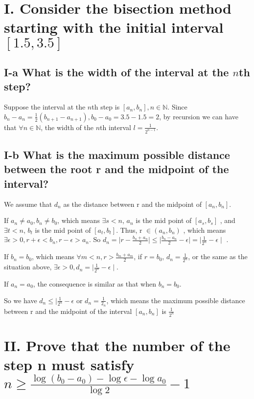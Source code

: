 \documentclass[twoside,a4paper]{article}
\begin{document}
\pagestyle{fancy}
\fancyhead{}


\section*{I. \small{Consider the bisection method starting with the initial interval $[1.5,3.5]$}}

\subsection*{I-a \small{What is the width of the interval at the $n$th step?}} 

Suppose the interval at the $n$th step is $[a_{n},b_{n}],n\in\mathbb{N}$. 
Since $b_{n}-a_{n}=\frac{1}{2}(b_{n+1}-a_{n+1}), b_{0}-a_{0}=3.5-1.5=2$, 
by recursion we can have that $\forall n\in\mathbb{N}$, the width of the $n$th interval $l=\frac{1}{2^{n-1}}$.
 
\subsection*{I-b \small{What is the maximum possible distance between the root r and the midpoint of the interval?}}

We assume that $d_{n}$ as the distance between r and the midpoint of $[a_{n}, b_{n}]$.  

If  $a_{n}\neq a_{0}, b_{n}\neq b_{0}$, which means $\exists s<n$, $a_{n}$ is the mid point of $[a_{s},b_{s}]$
, and $\exists t<n$, $b_{t}$ is the mid point of $[a_{t}, b_{t}]$. Thus, r $\in \left( a_{n},b_{n} \right) $ 
, which means $\exists \epsilon>0 , r+\epsilon<b_{n},r-\epsilon>a_{n}$. So $d_{n}= \mid r-\frac{b_{n}+a_{n}}{2} \mid \le
 \mid \frac{b_{n}-a_{n}}{2}-\epsilon \mid = \mid \frac{1}{2^{n}}-\epsilon \mid $
 . 
 
 If $b_{n}=b_{0}$, which means $\forall m<n, r>\frac{b_{m}+a_{m}}{2}$, if $r=b_{0}$, $d_{n} = \frac{1}{2^{n}}$, or 
 the same as the situation above, $\exists \epsilon>0, d_{n}=  \mid \frac{1}{2^{n}}-\epsilon \mid $.
 
 If $a_{n}=a_{0}$, the consequence is similar as that when $b_{n}=b_{0}$.
 
 So we have $d_{n} \le  \mid \frac{1}{2^{n}}-\epsilon$ or $d_{n}=\frac{1}{2_n}$, which means the maximum possible distance
 between r and the midpoint of the interval $[a_{n}, b_{n}]$ is $\frac{1}{2^{n}}$ 
 \section*{II. \small{Prove that the number of the step n must satisfy $n\ge \frac{\log(b_{0}-a_{0})-\log\epsilon-\log a_0}{\log2}-1$}}
\end{document}
